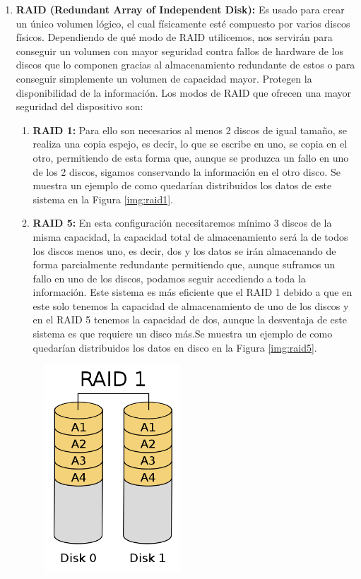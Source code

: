 \begin{enumerate}
\item {\bfseries RAID (Redundant Array of Independent Disk):}
Es usado para crear un único volumen lógico, el cual físicamente esté compuesto por varios discos físicos. Dependiendo de qué modo de RAID utilicemos, nos servirán para conseguir un volumen con mayor seguridad contra fallos de hardware de los discos que lo componen gracias al almacenamiento redundante de estos o para conseguir simplemente un volumen de capacidad mayor. Protegen la disponibilidad de la información.  Los modos de RAID que ofrecen una mayor seguridad del dispositivo son:
\begin{enumerate}
\item {\bfseries RAID 1:}
Para ello son necesarios al menos 2 discos de igual tamaño, se realiza una copia espejo, es decir, lo que se escribe en uno, se copia en el otro, permitiendo de esta forma que, aunque se produzca un fallo en uno de los 2 discos, sigamos conservando la información en el otro disco. Se muestra un ejemplo de como quedarían distribuidos los datos de este sistema en la Figura \ref{img:raid1}.
\item {\bfseries RAID 5:}
En esta configuración necesitaremos mínimo 3 discos de la misma capacidad, la capacidad total de almacenamiento será la de todos los discos menos uno, es decir, dos y los datos se irán almacenando de forma parcialmente redundante permitiendo que, aunque suframos un fallo en uno de los discos, podamos seguir accediendo a toda la información. Este sistema es más eficiente que el RAID 1 debido a que en este solo tenemos la capacidad de almacenamiento de uno de los discos y en el RAID 5 tenemos la capacidad de dos, aunque la desventaja de este sistema es que requiere un disco más.Se muestra un ejemplo de como quedarían distribuidos los datos en disco en la Figura \ref{img:raid5}.
\end{enumerate}
\begin{figure}[tphb]
  		   \centering
     		   \includegraphics[width=2in]{raid1.png}

\end{figure}
\end{enumerate}
